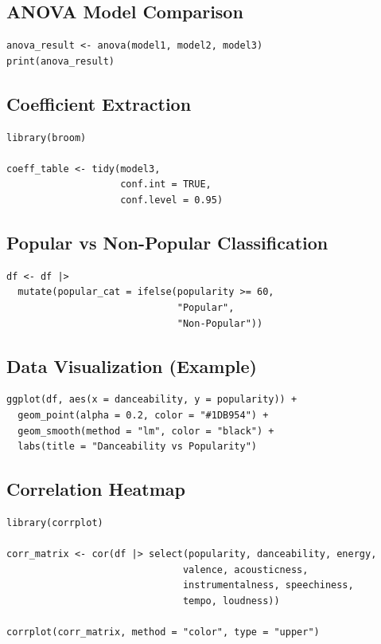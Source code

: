 \documentclass[12pt,a4paper]{article}
\begin{document}
\subsection{ANOVA Model Comparison}

\begin{lstlisting}
anova_result <- anova(model1, model2, model3)
print(anova_result)
\end{lstlisting}


\subsection{Coefficient Extraction}

\begin{lstlisting}
library(broom)

coeff_table <- tidy(model3,
                    conf.int = TRUE,
                    conf.level = 0.95)
\end{lstlisting}


\subsection{Popular vs Non-Popular Classification}

\begin{lstlisting}
df <- df |>
  mutate(popular_cat = ifelse(popularity >= 60,
                              "Popular",
                              "Non-Popular"))
\end{lstlisting}


\subsection{Data Visualization (Example)}

\begin{lstlisting}
ggplot(df, aes(x = danceability, y = popularity)) +
  geom_point(alpha = 0.2, color = "#1DB954") +
  geom_smooth(method = "lm", color = "black") +
  labs(title = "Danceability vs Popularity")
\end{lstlisting}

\subsection{Correlation Heatmap}

\begin{lstlisting}
library(corrplot)

corr_matrix <- cor(df |> select(popularity, danceability, energy,
                               valence, acousticness,
                               instrumentalness, speechiness,
                               tempo, loudness))

corrplot(corr_matrix, method = "color", type = "upper")
\end{lstlisting}
\end{document}
